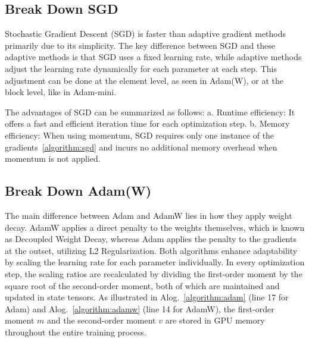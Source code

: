 \subsection{Break Down SGD}


Stochastic Gradient Descent (SGD) is faster than adaptive gradient methods primarily due to its simplicity. The key difference between SGD and these adaptive methods is that SGD uses a fixed learning rate, while adaptive methods adjust the learning rate dynamically for each parameter at each step. This adjustment can be done at the element level, as seen in Adam(W), or at the block level, like in Adam-mini.

The advantages of SGD can be summarized as follows: 
a. Runtime efficiency: It offers a fast and efficient iteration time for each optimization step.  
b. Memory efficiency: When using momentum, SGD requires only one instance of the gradients~\ref{algorithm:sgd} and incurs no additional memory overhead when momentum is not applied.

\subsection{Break Down Adam(W)}
The main difference between Adam and AdamW lies in how they apply weight decay. AdamW applies a direct penalty to the weights themselves, which is known as Decoupled Weight Decay, whereas Adam applies the penalty to the gradients at the outset, utilizing L2 Regularization. 
Both algorithms enhance adaptability by scaling the learning rate for each parameter individually. In every optimization step, the scaling ratios are recalculated by dividing the first-order moment by the square root of the second-order moment, both of which are maintained and updated in state tensors.
As illustrated in Alog.~\ref{algorithm:adam} (line 17 for Adam) and Alog.~\ref{algorithm:adamw} (line 14 for AdamW), the first-order moment $m$ and the second-order moment $v$ are stored in GPU memory throughout the entire training process.

